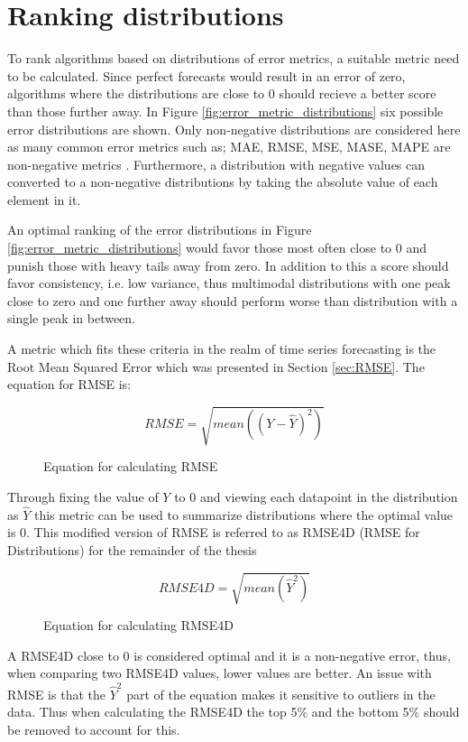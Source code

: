 \section{Ranking distributions}
\label{sec:ranking_distributions}
To rank algorithms based on distributions of error metrics, a suitable metric need to be calculated. Since perfect forecasts would result in an error of zero, algorithms where the distributions are close to 0 should recieve a better score than those further away. In Figure \ref{fig:error_metric_distributions} six possible error distributions are shown. Only non-negative distributions are considered here as many common error metrics such as; MAE, RMSE, MSE, MASE, MAPE are non-negative metrics \cite{gluonts-github,hyndman_forecasting_3rd}. Furthermore, a distribution with negative values can converted to a non-negative distributions by taking the absolute value of each element in it.

An optimal ranking of the error distributions in Figure \ref{fig:error_metric_distributions} would favor those most often close to 0 and punish those with heavy tails away from zero. In addition to this a score should favor consistency, i.e. low variance, thus multimodal distributions with one peak close to zero and one further away should perform worse than distribution with a single peak in between.

A metric which fits these criteria in the realm of time series forecasting is the Root Mean Squared Error which was presented in Section \ref{sec:RMSE}. The equation for RMSE is:

\begin{figure}[h]
  \[RMSE = \sqrt{mean((Y - \hat{Y})^2)}\]
  \caption{Equation for calculating RMSE}
\end{figure}

Through fixing the value of \(Y\) to 0 and viewing each datapoint in the distribution as \(\hat{Y}\) this metric can be used to summarize distributions where the optimal value is 0. This modified version of RMSE is referred to as RMSE4D (RMSE for Distributions) for the remainder of the thesis

\begin{figure}[h]
  \[RMSE4D = \sqrt{mean(\hat{Y}^2)}\]
  \caption{Equation for calculating RMSE4D}
\end{figure}

A RMSE4D close to 0 is considered optimal and it is a non-negative error, thus, when comparing two RMSE4D values, lower values are better. An issue with RMSE is that the \(\hat{Y}^2\) part of the equation makes it sensitive to outliers in the data. Thus when calculating the RMSE4D the top 5\% and the bottom 5\% should be removed to account for this.

